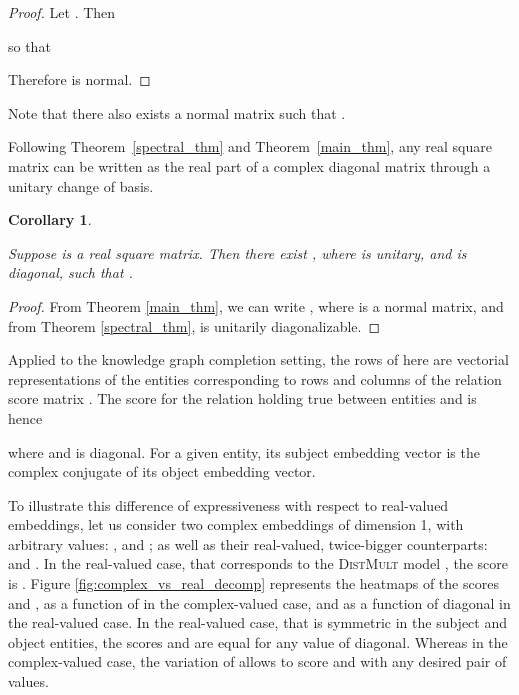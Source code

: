 \documentclass[twoside,11pt]{article}
\renewcommand{\cite}{\citep}
\newtheorem{cor}{Corollary}
\begin{document}
\begin{proof}
Let . Then

so that 

Therefore  is normal.
\end{proof}
Note that there also exists a normal matrix  such that .





Following Theorem~\ref{spectral_thm} and Theorem~\ref{main_thm}, any
real square matrix can be written as the real part of a complex diagonal
matrix through a unitary change of basis.

\begin{cor}
\label{cor_real_diag}

Suppose  is a real square matrix. Then there exist , where  is unitary, and  is diagonal, such that .

\end{cor}

\begin{proof}
From Theorem \ref{main_thm}, we can write , where  is a normal matrix,
and from Theorem \ref{spectral_thm},  is unitarily diagonalizable.
\end{proof}


Applied to the knowledge graph completion setting, the rows of  here are vectorial representations of the entities corresponding 
to rows and columns of the relation score matrix . 
The score for the relation holding true between entities  and  is hence

where  and  is diagonal.
For a given entity,
its subject embedding vector is the complex conjugate of its object embedding vector. 



To illustrate this difference of expressiveness with respect to real-valued embeddings,
let us consider two complex embeddings  of dimension 1,
with arbitrary values: , and ; as well as
their real-valued, twice-bigger counterparts:  and
.
In the real-valued case, that corresponds to the \textsc{DistMult} model \cite{Yang2015},
the score is .
Figure \ref{fig:complex_vs_real_decomp} represents the heatmaps of the scores
 and , as a function of  in the complex-valued case, 
and as a function of  diagonal in the real-valued case.
In the real-valued case, that is symmetric in the subject and object entities, 
the scores  and  are equal for any value of  diagonal.
Whereas in the complex-valued case, the variation of 
allows to score  and  with any desired pair of values.
\end{document}
